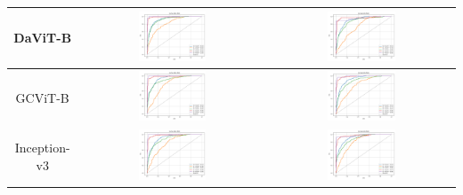 \begin{table}[!htbp]
\begin{tabular}{|c|c|c|}
        DaViT-B & \includegraphics[width=0.38\textwidth]{figs/auc_roc/davit_base-msft_in1k_auc_roc_cross_entropy.png} & \includegraphics[width=0.38\textwidth]{figs/auc_roc/davit_base-msft_in1k_auc_roc_corn.png} \\ \hline
        GCViT-B & \includegraphics[width=0.38\textwidth]{figs/auc_roc/gcvit_base-in1k_auc_roc_cross_entropy.png} & \includegraphics[width=0.38\textwidth]{figs/auc_roc/gcvit_base-in1k_auc_roc_corn.png} \\ \hline
        Inception-v3 & \includegraphics[width=0.38\textwidth]{figs/auc_roc/inception_v3_auc_roc_cross_entropy.png} & \includegraphics[width=0.38\textwidth]{figs/auc_roc/inception_v3_auc_roc_corn.png} \\ \hline

\end{tabular}
\end{table}
